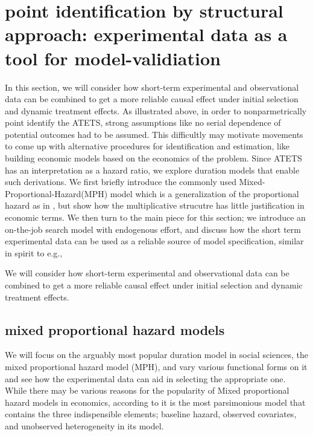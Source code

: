 \documentclass{article}
\begin{document}
\section{point identification by structural approach: experimental data as a tool for model-validiation}
In this section, we will consider how short-term experimental and observational data can be combined to get a more reliable causal effect under initial selection and dynamic treatment effects. As illustrated above, in order to nonparmetrically point identify the ATETS, strong assumptions like no serial dependence of potential outcomes 
had to be assumed. This difficultly may motivate movements to come up with alternative procedures for identification and estimation, like building economic models based on the economics of the problem. Since ATETS has an interpretation as a hazard ratio, we explore duration models that enable such derivations. We first briefly 
introduce the commonly used Mixed-Proportional-Hazard(MPH) model which is a generalization of the proportional hazard as in \cite{citecox}, but show how the multiplicative strucutre has little justification in economic terms. We then turn to the main piece for this section; we introduce an on-the-job search model with endogenous effort,
 and discuss how the short term experimental data can be used as a reliable source of model specification, similar in spirit to e.g., \cite{cite toddwolpin 2006,todd2020best}
 
 

We will consider how short-term experimental and observational data can be combined to get a more reliable causal effect under initial selection and dynamic treatment effects.

\subsection{mixed proportional hazard models}
 We will focus on the arguably most popular duration model in social sciences, the mixed proportional hazard model (MPH), and vary various functional forms on it and see how the experimental data can aid in selecting the appropriate one.\\
While there may be various reasons for the popularity of Mixed proportional hazard models in economics, according to \cite{heckman1984method, van2001duration, abbring2003nonparametric} it is the most parsimonious model that contains the three indispensible elements; baseline hazard, observed covariates, 
and unobserved heterogeneity in its model. 
\end{document}
